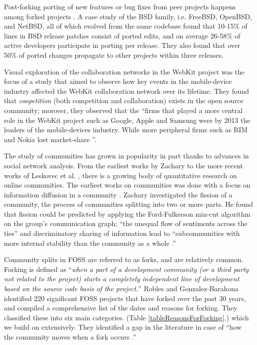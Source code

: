 \documentclass{acm_proc_article-sp}
\begin{document}
Post-forking porting of new features or bug fixes from peer projects happens among forked projects \cite{Baishakhi}. A case study of the BSD family, i.e. FreeBSD, OpenBSD, and NetBSD, all of which evolved from the same codebase found that 10-15\% of lines in BSD release patches consist of ported edits, and on average 26-58\% of active developers participate in porting per release. They also found that over 50\% of ported changes propagate to other projects within three releases. \cite{Baishakhi}

Visual exploration of the collaboration networks in the WebKit project was the focus of a study that aimed to observe how key events in the mobile-device industry affected the WebKit collaboration network over its lifetime. \cite{JoseWebKit} They found that \textit{coopetition} (both competition and collaboration) exists in the open source community; morover, they observed that the ``firms that played a more central role in the WebKit project such as Google, Apple and Samsung were by 2013 the leaders of the mobile-devices industry. While more peripheral firms such as RIM and Nokia lost market-share \cite{JoseWebKit}''.

The study of communities has grown in popularity in part thanks to advances in social network analysis.  From the earliest works by Zachary \cite{Zachary} to the more recent works of Leskovec et al. \cite{LeskovecGraphsOverTime}\cite{LeskovecStatisticalPropertiesOfCommunityStructure}, there is a growing body of quantitative research on online communities. The earliest works on communities was done with a focus on information diffusion in a community \cite{Zachary}. Zachary investigated the fission of a community, the process of communities splitting into two or more parts. He found that fission could be predicted by applying the Ford-Fulkerson min-cut algorithm \cite{Ford} on the group's communication graph; ``the unequal flow of sentiments across the ties'' and discriminatory sharing of information lead to ``subcommunities with more internal stability than the community as a whole \cite{Zachary}.''

Community splits in FOSS are referred to as forks, and are relatively common. Forking is defined as ``\textit{when a part of a development community (or a third party not related to the project) starts a completely independent line of development based on the source code basis of the project.}'' Robles and Gonzalez-Barahona \cite{Robles} identified 220 significant FOSS projects that have forked over the past 30 years, and compiled a comprehensive list of the dates and reasons for forking. They classified these into six main categories. (Table \ref{tableReasonsForForking}.) which we build on extensively. They identified a gap in the literature in case of ``how the community moves when a fork occurs \cite{Robles}.''
\end{document}

